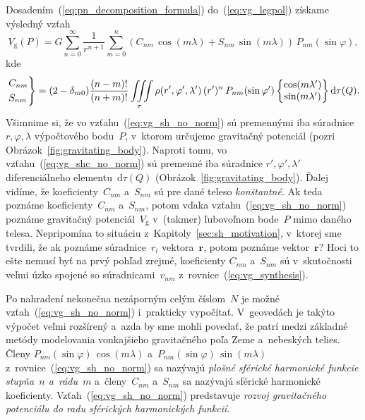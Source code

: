 \documentclass[a4paper, 12pt]{book}
\newcommand{\diff}{\mathrm d}
\newcommand{\gidx}{\mathrm g}
\let\vec\mathbf
\begin{document}
Dosadením~(\ref{eq:pn_decomposition_formula}) do~(\ref{eq:vg_legpol})
získame výsledný vzťah
%
\begin{equation}
\label{eq:vg_sh_no_norm}
V_\gidx(P) = G \sum_{n = 0}^\infty \frac{1}{r^{n + 1}} \sum_{m = 0}^{n} \left(
C_{nm} \, \cos(m\lambda) + S_{nm} \, \sin(m\lambda)\right) \,
P_{nm}(\sin\varphi){,}
\end{equation}
%
kde
%
\begin{equation}
\label{eq:vg_shc_no_norm}
\begin{rcases}
C_{nm}\\
S_{nm}
\end{rcases}
= (2 - \delta_{m0}) \frac{(n - m)!}{(n + m)!} \iiint\limits_{\tau} \rho(r',
\varphi', \lambda') \, (r')^n \, P_{nm}(\sin\varphi')
%
\begin{Bmatrix}
\cos(m\lambda')\\
\sin(m\lambda')
\end{Bmatrix}
%
\diff\tau(Q){.}
\end{equation}
%
Všimnime si, že vo vzťahu~(\ref{eq:vg_sh_no_norm}) sú premennými iba súradnice 
$r, \varphi, \lambda$ výpočtového bodu~$P$, v~ktorom určujeme gravitačný 
potenciál (pozri Obrázok~\ref{fig:gravitating_body}).  Naproti tomu, vo 
vzťahu~(\ref{eq:vg_shc_no_norm}) sú premenné iba súradnice $r',\varphi', 
\lambda'$ diferenciálneho elementu~$\diff\tau(Q)$ 
(Obrázok~\ref{fig:gravitating_body}).  Ďalej vidíme, že koeficienty~$C_{nm}$ 
a~$S_{nm}$ sú pre dané teleso \emph{konštantné}.  Ak teda poznáme 
koeficienty~$C_{nm}$ a~$S_{nm}$, potom vďaka vzťahu~(\ref{eq:vg_sh_no_norm}) 
poznáme gravitačný potenciál~$V_\gidx$ v~(takmer) ľubovoľnom bode~$P$ mimo 
daného telesa.  Nepripomína to situáciu z~Kapitoly~\ref{sec:sh_motivation}, 
v~ktorej sme tvrdili, že ak poznáme súradnice~$r_i$ vektora~$\vec r$, potom 
poznáme vektor~$\vec r$?  Hoci to ešte nemusí byť na prvý pohľad zrejmé, 
koeficienty $C_{nm}$ a~$S_{nm}$ sú v~skutočnosti veľmi úzko spojené so 
súradnicami~$v_{nm}$ z~rovnice~(\ref{eq:vg_synthesis}).

Po nahradení nekonečna nezáporným celým číslom~$N$ je možné 
vzťah~(\ref{eq:vg_sh_no_norm}) i~prakticky vypočítať.  V~geovedách je takýto
výpočet veľmi rozšírený a~azda by sme mohli povedať, že patrí medzi základné  
metódy modelovania vonkajšieho
gravitačného poľa Zeme a~nebeských telies.  Členy $P_{nm}(\sin\varphi) \,
\cos(m\lambda)$ a~$ P_{nm}(\sin\varphi) \, \sin(m\lambda)$
z~rovnice~(\ref{eq:vg_sh_no_norm}) sa nazývajú \emph{plošné sférické harmonické
funkcie stupňa~$n$ a~rádu~$m$} a~členy~$C_{nm}$ a~$S_{nm}$ sa nazývajú sférické
harmonické koeficienty.  Vzťah~(\ref{eq:vg_sh_no_norm}) predstavuje
\emph{rozvoj gravitačného potenciálu do radu sférických harmonických funkcií}.
\end{document}
